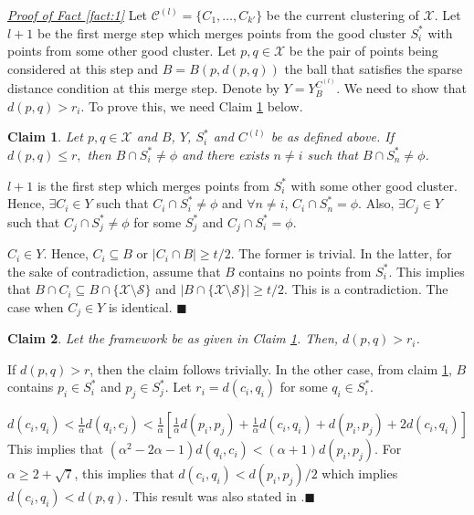 \documentclass[orivec]{llncs}
\newtheorem{smallLemma}{Claim}
\newcommand{\mc}{\mathcal}
\renewcommand{\qed}{\hfill\ensuremath{\blacksquare}}
\begin{document}
\noindent\textit{\underline{Proof of Fact \ref{fact:1}}}
Let $\mc C^{(l)} = \{C_1, \ldots, C_{k'}\}$ be the current clustering of $\mc X$. Let $l+1$ be the first merge step which merges points from the good cluster $S_i^*$ with points from some other good cluster. Let $p, q \in \mc X$ be the pair of points being considered at this step and $B = B(p, d(p, q))$ the ball that satisfies the sparse distance condition at this merge step. Denote by $Y = Y_{B}^{C^{(l)}}$. We need to show that $d(p, q) > r_i$. To prove this, we need Claim \ref{claim:fromBothCluster} below. 

\begin{smallLemma}
\label{claim:fromBothCluster}
Let $p, q \in \mc X$ and $B$, $Y$, $S_i^*$ and $C^{(l)}$ be as defined above. If $d(p, q) \le r,$ then $B \cap S_i^* \neq \phi$ and there exists $n \neq i$ such that $B \cap S_n^* \neq \phi$.
\end{smallLemma}
\vspace{-0.1in} $l+1$ is the first step which merges points from $S_i^*$ with some other good cluster. Hence, $\exists C_i \in Y$ such that $C_i\cap S_i^*  \neq \phi$ and $\forall n \neq i$, $C_i \cap S_n^* = \phi$. Also, $\exists C_j \in Y$ such that $C_j \cap S_j^* \neq \phi$ for some $S_j^*$ and $C_j \cap S_i^* = \phi$.

$C_i \in Y$. Hence, $C_i \subseteq B$ or $|C_i \cap B| \ge t/2$. The former is trivial. In the latter, for the sake of contradiction, assume that $B$ contains no points from $S_i^*$. This implies that $B \cap C_i \subseteq B \cap \{\mc X \setminus \mc S\}$ and $|B\cap \{\mc X \setminus \mc S\}| \ge t/2$. This  is a contradiction. The case when $C_j \in Y$ is identical. \qed

\begin{smallLemma}
\label{claim:maxrirj}
Let the framework be as given in Claim \ref{claim:fromBothCluster}. Then, $d(p, q) > r_i$.
\end{smallLemma}

\vspace{-0.1in} \noindent If $d(p, q) > r$, then the claim follows trivially. In the other case, from claim \ref{claim:fromBothCluster}, $B$ contains $p_i \in S_i^*$ and $p_j \in S_j^*$. Let $r_i = d(c_i, q_i)$ for some $q_i \in S_i^*$.

$d(c_i, q_i) < \frac{1}{\alpha} d(q_i, c_j) < \frac{1}{\alpha} [ \frac{1}{\alpha}d(p_i, p_j) + \frac{1}{\alpha}d(c_i, q_i) + d(p_i, p_j) + 2d(c_i, q_i)]$
This implies that $(\alpha^2 - 2\alpha - 1)d(q_i, c_i) < (\alpha + 1) d(p_i, p_j)$. For $\alpha \ge 2 + \sqrt 7$, this implies that $d(c_i, q_i) < d(p_i, p_j)/2$ which implies $d(c_i, q_i) < d(p, q)$. This result was also stated in \cite{balcan2012clustering}.\qed
\end{document}

